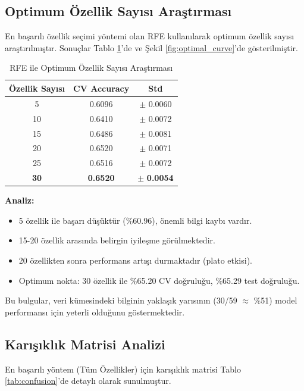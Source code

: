 \documentclass[conference]{IEEEtran}
\begin{document}
\subsection{Optimum Özellik Sayısı Araştırması}

En başarılı özellik seçimi yöntemi olan RFE kullanılarak optimum özellik sayısı araştırılmıştır. Sonuçlar Tablo \ref{tab:optimal_search}'de ve Şekil \ref{fig:optimal_curve}'de gösterilmiştir.

\begin{table}[H]
\centering
\caption{RFE ile Optimum Özellik Sayısı Araştırması}
\label{tab:optimal_search}
\begin{tabular}{ccc}
\toprule
\textbf{Özellik Sayısı} & \textbf{CV Accuracy} & \textbf{Std} \\
\midrule
5 & 0.6096 & $\pm$ 0.0060 \\
10 & 0.6410 & $\pm$ 0.0072 \\
15 & 0.6486 & $\pm$ 0.0081 \\
20 & 0.6520 & $\pm$ 0.0071 \\
25 & 0.6516 & $\pm$ 0.0072 \\
\textbf{30} & \textbf{0.6520} & $\pm$ \textbf{0.0054} \\
\bottomrule
\end{tabular}
\end{table}

\textbf{Analiz:} 
\begin{itemize}
    \item 5 özellik ile başarı düşüktür (\%60.96), önemli bilgi kaybı vardır.
    \item 15-20 özellik arasında belirgin iyileşme görülmektedir.
    \item 20 özellikten sonra performans artışı durmaktadır (plato etkisi).
    \item Optimum nokta: 30 özellik ile \%65.20 CV doğruluğu, \%65.29 test doğruluğu.
\end{itemize}

Bu bulgular, veri kümesindeki bilginin yaklaşık yarısının (30/59 $\approx$ \%51) model performansı için yeterli olduğunu göstermektedir.

\subsection{Karışıklık Matrisi Analizi}

En başarılı yöntem (Tüm Özellikler) için karışıklık matrisi Tablo \ref{tab:confusion}'de detaylı olarak sunulmuştur.
\end{document}
